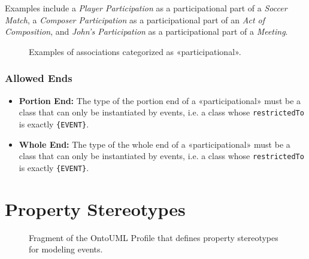 Examples include a \textit{Player Participation} as a participational part of a \textit{Soccer Match}, a \textit{Composer Participation} as a participational part of an \textit{Act of Composition}, and \textit{John's Participation} as a participational part of a \textit{Meeting}.

\begin{figure}[h]
    \centering
    
    \caption{Examples of associations categorized as «participational».}
    \label{fig:participational-example}
\end{figure}

\subsubsection{Allowed Ends}

\begin{itemize}
    \item \textbf{Portion End:} The type of the portion end of a «participational» must be a class that can only be instantiated by events, i.e. a class whose \texttt{restrictedTo} is exactly \texttt{\{EVENT\}}.
    \item \textbf{Whole End:} The type of the whole end of a «participational» must be a class that can only be instantiated by events, i.e. a class whose \texttt{restrictedTo} is exactly \texttt{\{EVENT\}}.
\end{itemize}




\section{Property Stereotypes}

\begin{figure}[h]
    \centering
    
    \caption{Fragment of the OntoUML Profile that defines property stereotypes for modeling events.}
    \label{fig:event-properties-profile}
\end{figure}


